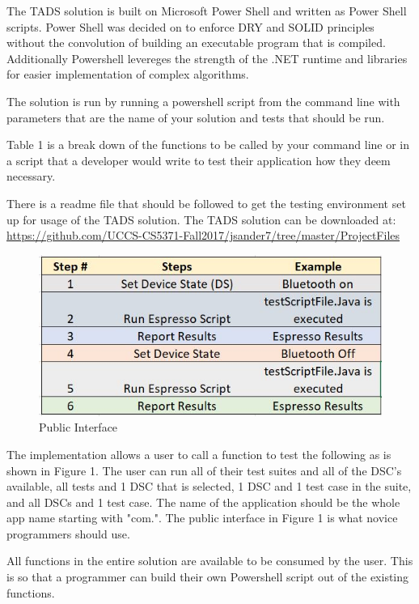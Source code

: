 The TADS solution is built on Microsoft Power Shell and written as Power Shell scripts.  Power Shell was decided on to enforce DRY and SOLID principles without the convolution of building an executable program that is compiled.  Additionally Powershell levereges the strength of the .NET runtime and libraries for easier implementation of complex algorithms.    

The solution is run by running a powershell script from the command line with parameters that are the name of your solution and tests that should be run.

Table 1 is a break down of the functions to be called by your command line or in a script that a developer would write to test their application how they deem necessary.  

There is a readme file that should be followed to get the testing environment set up for usage of the TADS solution.  The TADS solution can be downloaded at: \url{https://github.com/UCCS-CS5371-Fall2017/jsander7/tree/master/ProjectFiles} \\

\begin{figure}[t]
	\centering
	\caption[Public Interface]{Public Interface}
	\label{fig:table1}
	\includegraphics[width=1\linewidth]{table1}
\end{figure}

The implementation allows a user to call a function to test the following as is shown in Figure 1.  The user can run all of their test suites and all of the DSC's available, all tests and 1 DSC that is selected, 1 DSC and 1 test case in the suite, and all DSCs and 1 test case. The name of the application should be the whole app name starting with "com.". The public interface in Figure 1 is what novice programmers should use.   

All functions in the entire solution are available to be consumed by the user.  This is so that a programmer can build their own Powershell script out of the existing functions.  

